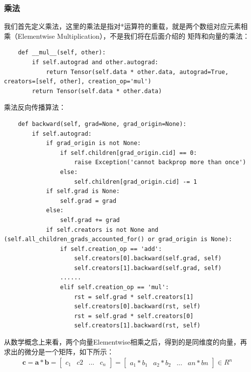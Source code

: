 \subsubsection{乘法}
我们首先定义乘法，这里的乘法是指对*运算符的重载，就是两个数组对应元素相乘（Elementwise Multiplication），不是我们将在后面介绍的
矩阵和向量的乘法：
\begin{lstlisting}
    def __mul__(self, other):
        if self.autograd and other.autograd:
            return Tensor(self.data * other.data, autograd=True, creators=[self, other], creation_op='mul')
        return Tensor(self.data * other.data)
\end{lstlisting}
乘法反向传播算法：
\begin{lstlisting}
    def backward(self, grad=None, grad_origin=None):
        if self.autograd:
            if grad_origin is not None:
                if self.children[grad_origin.cid] == 0:
                    raise Exception('cannot backprop more than once')
                else:
                    self.children[grad_origin.cid] -= 1
            if self.grad is None:
                self.grad = grad
            else:
                self.grad += grad
            if self.creators is not None and (self.all_children_grads_accounted_for() or grad_origin is None):
                if self.creation_op == 'add':
                    self.creators[0].backward(self.grad, self)
					self.creators[1].backward(self.grad, self)
				......
                elif self.creation_op == 'mul':
                    rst = self.grad * self.creators[1]
                    self.creators[0].backward(rst, self)
                    rst = self.grad * self.creators[0]
                    self.creators[1].backward(rst, self)
\end{lstlisting}
从数学概念上来看，两个向量Elementwise相乘之后，得到的是同维度的向量，再求出的微分是一个矩阵，如下所示：
\begin{equation}
\begin{aligned}
\boldsymbol{c} = \boldsymbol{a} * \boldsymbol{b} = \begin{bmatrix}
	c_{1} & c{2} & ... & c_{n}
\end{bmatrix} = \begin{bmatrix}
	a_{1}*b_{1} & a_{2}*b_{2} & ... & a{n}*b{n}
\end{bmatrix} \in R^{n}
\end{aligned}
\label{chpZ01-vector-elementwise-mul}
\end{equation}
